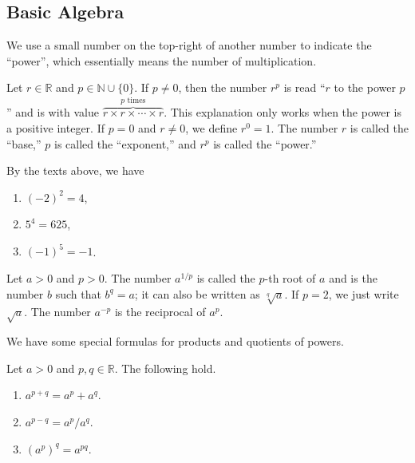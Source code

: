 \documentclass[11pt]{book}
\theoremstyle{break}
\theoremstyle{no_label}
\newcommand{\bbR}{\mathbb{R}}
\newcommand{\bbN}{\mathbb{N}}
\numberwithin{equation}{section}
\begin{document}
\subsection*{Basic Algebra}

We use a small number on the top-right of another number to indicate the ``power'', which essentially means the number of multiplication.
\begin{notation}
    Let $r\in\bbR$ and $p\in\bbN\cup\{0\}$. If $p\ne0$, then the number $r^p$ is read ``$r$ to the power $p$'' and is with value $\overbrace{r\times r\times \cdots\times r}^{\text{$p$ times}}$. This explanation only works when the power is a positive integer. If $p=0$ and $r\ne0$, we define $r^0=1$. The number $r$ is called the ``base,'' $p$ is called the ``exponent,'' and $r^p$ is called the ``power.''
\end{notation}

\begin{example}
    By the texts above, we have 
    \vspace{-1em}
    \begin{multicols}{3}
        \begin{enumerate}
            \item $(-2)^2=4$,
            \item $5^4=625$,
            \item $(-1)^5=-1$.
        \end{enumerate}
    \end{multicols}
    \vspace{0.1em}
\end{example}

\begin{notation}
    Let $a>0$ and $p>0$. The number $a^{1/p}$ is called the $p$-th root of $a$ and is the number $b$ such that $b^q=a$; it can also be written as $\sqrt[q]{a}$. If $p=2$, we just write $\sqrt{a}$. The number $a^{-p}$ is the reciprocal of $a^p$.
\end{notation}

We have some special formulas for products and quotients of powers.

\begin{theorem}
    Let $a>0$ and $p, q\in\mathbb R$. The following hold.
    \vspace{-1em}
    \begin{multicols}{3}
        \begin{enumerate}
            \item $a^{p+q}=a^p+a^q$.
            \item $a^{p-q}={a^p}/{a^q}$.
            \item $(a^p)^q=a^{pq}$.
        \end{enumerate}
    \end{multicols}
    \vspace{0.1em}
\end{theorem}
\end{document}
